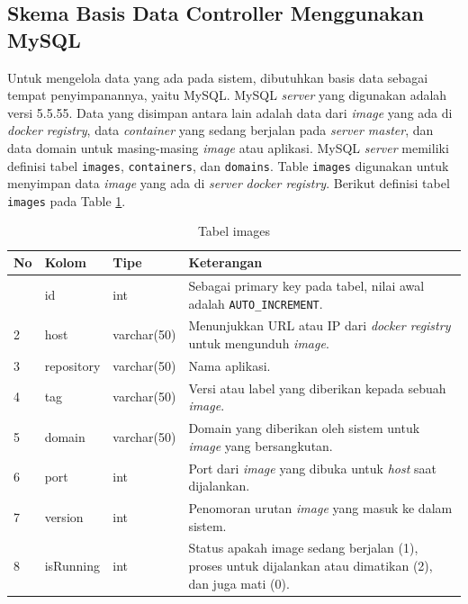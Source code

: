         \subsection{Skema Basis Data Controller Menggunakan MySQL}
        	Untuk mengelola data yang ada pada sistem, dibutuhkan basis data sebagai tempat penyimpanannya, yaitu MySQL. MySQL \textit{server} yang digunakan adalah versi 5.5.55. Data yang disimpan antara lain adalah data dari \textit{image} yang ada di \textit{docker registry}, data \textit{container} yang sedang berjalan pada \textit{server master}, dan data domain untuk masing-masing \textit{image} atau aplikasi.
            MySQL \textit{server} memiliki definisi tabel \texttt{images}, \texttt{containers}, dan \texttt{domains}. Table \texttt{images} digunakan untuk menyimpan data \textit{image} yang ada di \textit{server} \textit{docker registry}. Berikut definisi tabel \texttt{images} pada Table \ref{tabelImages}.
        
        \begin{longtable}{|p{}|p{}|p{}|p{}|}
			\caption{Tabel images} \label{tabelImages} \\
			\hline
			\textbf{No} & \textbf{Kolom} & \textbf{Tipe} & \textbf{Keterangan} \\ \hline
			\endhead
			\endfoot
			\endlastfoot
			1 & id & int & Sebagai primary key pada tabel, nilai awal adalah \texttt{AUTO\_INCREMENT}. \\ \hline
			2 & host & varchar(50) & Menunjukkan URL atau IP dari \textit{docker registry} untuk mengunduh \textit{image}. \\ \hline
			3 & repository & varchar(50) & Nama aplikasi. \\ \hline
			4 & tag & varchar(50) & Versi atau label yang diberikan kepada sebuah \textit{image}. \\ \hline
			5 & domain & varchar(50) & Domain yang diberikan oleh sistem untuk \textit{image} yang bersangkutan. \\ \hline
			6 & port & int & Port dari \textit{image} yang dibuka untuk \textit{host} saat dijalankan. \\ \hline
			7 & version & int & Penomoran urutan \textit{image} yang masuk ke dalam sistem. \\ \hline
            8 & isRunning & int & Status apakah image sedang berjalan (1), proses untuk dijalankan atau dimatikan (2), dan juga mati (0). \\ \hline
		\end{longtable}
        
